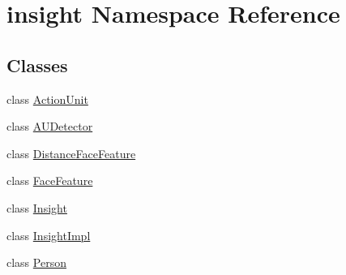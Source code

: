 \hypertarget{namespaceinsight}{}\section{insight Namespace Reference}
\label{namespaceinsight}
\subsection*{Classes}
\begin{DoxyCompactItemize}
\item 
class \hyperlink{classinsight_1_1ActionUnit}{Action\+Unit}
\item 
class \hyperlink{classinsight_1_1AUDetector}{A\+U\+Detector}
\item 
class \hyperlink{classinsight_1_1DistanceFaceFeature}{Distance\+Face\+Feature}
\item 
class \hyperlink{classinsight_1_1FaceFeature}{Face\+Feature}
\item 
class \hyperlink{classinsight_1_1Insight}{Insight}
\item 
class \hyperlink{classinsight_1_1InsightImpl}{Insight\+Impl}
\item 
class \hyperlink{classinsight_1_1Person}{Person}
\end{DoxyCompactItemize}
